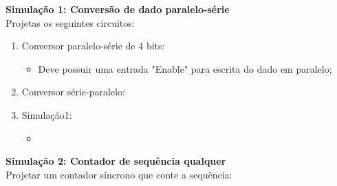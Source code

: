 \documentclass{article}
\newcommand{\titulo}[1]{{\bf #1}}
\begin{document}
\noindent
\titulo{\large Simulação 1: Conversão de dado paralelo-série} \\
Projetas os seguintes circuitos:
\begin{enumerate}
	\item{Conversor paralelo-série de 4 bits:}
	\begin{itemize}
		\item{Deve possuir uma entrada "Enable" para escrita do dado em paralelo;}
	\end{itemize}
	\item{Conversor série-paralelo:}
	\item{Simulação1:}
	\begin{itemize}
		\item{}
	\end{itemize}
\end{enumerate}

\vspace{3mm}
\noindent
\titulo{\large Simulação 2: Contador de sequência qualquer} \\
Projetar um contador síncrono que conte a sequência:
\\
\end{document}
